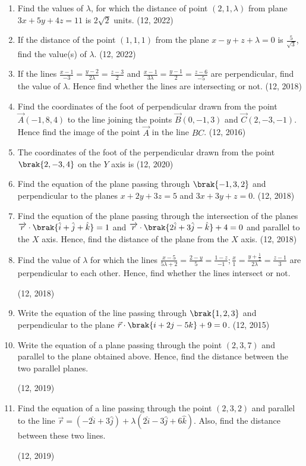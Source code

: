 \begin{enumerate}[label=\thesubsection.\arabic*, ref=\thesubsection.\theenumi]
\item Find the values of $\lambda$, for which the distance of point $(2,1,\lambda)$ from plane $3x+5y+4z=11$ is $2\sqrt{2}$ units. \hfill (12, 2022)
\item If the distance of the point $(1,1,1)$ from the plane $x-y+z+\lambda=0$ is $\frac{5}{\sqrt{3}}$, find the value(s) of $\lambda$. \hfill (12, 2022)
\item If the lines $\frac{x-1}{-3} = \frac{y-2}{2\lambda} = \frac{z-3}{2} $ and $\frac{x-1}{3\lambda} = \frac{y-1}{2}  = \frac{z-6}{-5} $ are perpendicular, find the value of $\lambda$. Hence find whether the lines are intersecting or not.
	\hfill (12, 2018)
\item Find the coordinates of the foot of perpendicular drawn from the point
      $\vec{A}(-1, 8, 4)$ to the line joining the points $\vec{B}(0, -1, 3)$ and $\vec{C}(2,-3,-1)$. Hence
      find the image of the point $\vec{A}$ in the line $BC$. \hfill (12, 2016)
\item The coordinates of the foot of the perpendicular drawn from the point $\brak{2,-3,4}$ on the $Y$ axis is
\hfill (12, 2020)
\item Find the equation of the plane passing through $\brak{-1,3,2}$ and perpendicular to the planes $x+2y+3z=5$ and $3x+3y+z=0$.
\hfill (12, 2018)
\item Find the equation of the plane passing through the intersection of the planes 
$	\overrightarrow{{r}} \cdot \brak{\hat{i} + \hat{j} + \hat{k}} = 1$
and 
$	\overrightarrow{{r}} \cdot \brak{2\hat{i} + 3\hat{j} - \hat{k} } + 4 = 0$
and parallel to the $X$ axis. Hence, find the distance of the plane from the $X$ axis.
\hfill (12, 2018)
 \item Find the value of $\lambda$ for which the lines $\frac{x-5}{5\lambda+2}= \frac{2-y}{5} = \frac{1-z}{-1};\frac{x}{1}=\frac{y+\frac{1}{2}}{2\lambda}=\frac{z-1}{3} $ are perpendicular to each other.
Hence, find whether the lines intersect or not.

\hfill (12, 2018)
\item Write the equation of the line passing through $\brak{1,2,3}$ and perpendicular to the plane $\vec{r}\cdot\brak{{i}+2{j}-5{k}}+9=0$. \hfill (12, 2015)
	\item Write the equation of a plane passing through the point $(2, 3, 7)$ and parallel to the plane obtained above. Hence, find the distance between the two parallel planes.

		\hfill (12, 2019)
	\item Find the  equation of a line passing through the point $(2, 3, 2)$ and parallel to the line $\overrightarrow{r} = (-2\hat{i} + 3\hat{j}) + \lambda (2\hat{i} - 3\hat{j} + 6\hat{k})$. Also, find the distance between these two lines.

		\hfill (12, 2019)
\end{enumerate}

